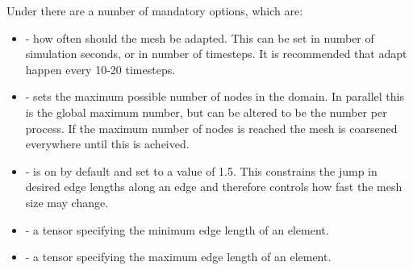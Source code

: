 Under  there are a number of mandatory options, which are:
\begin{itemize}
\item {} - how often should the mesh be adapted. This can be set in number of simulation seconds, 
or in number of timesteps. It is recommended that adapt happen every 10-20 timesteps.
\item {} - sets the maximum possible number of nodes in the domain. In parallel this is the
global maximum number, but can be altered to be the number per process. If the maximum number of nodes is reached the mesh is coarsened everywhere until this is acheived.
\item {} - is on by default and set to a value of 1.5. This constrains the jump in desired edge lengths along an edge and therefore controls how fast the mesh size may change.
\item {} - a tensor specifying the minimum edge length of an element.
\item {} - a tensor specifying the maximum edge length of an element.
\end{itemize}

